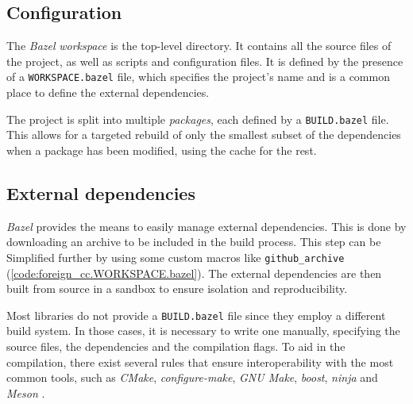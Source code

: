 \subsection*{Configuration}

The \textit{Bazel} \textit{workspace} is the top-level directory.
It contains all the source files of the project, as well as scripts and configuration files.
It is defined by the presence of a \texttt{WORKSPACE.bazel} file, which specifies the project's name and is a common place to define the external dependencies.



The project is split into multiple \textit{packages}, each defined by a \texttt{BUILD.bazel} file.
This allows for a targeted rebuild of only the smallest subset of the dependencies when a package has been modified, using the cache for the rest.



\subsection*{External dependencies}

\textit{Bazel} provides the means to easily manage external dependencies.
This is done by downloading an archive to be included in the build process.
This step can be Simplified further by using some custom macros like \texttt{github\_archive} (\autoref{code:foreign_cc.WORKSPACE.bazel}).
The external dependencies are then built from source in a sandbox to ensure isolation and reproducibility.

Most libraries do not provide a \texttt{BUILD.bazel} file since they employ a different build system.
In those cases, it is necessary to write one manually, specifying the source files, the dependencies and the compilation flags.
To aid in the compilation, there exist several rules that ensure interoperability with the most common tools, such as \textit{CMake}, \textit{configure-make}, \textit{GNU Make}, \textit{boost}, \textit{ninja} and \textit{Meson} \cite{repo:rules-foreign-cc}.



